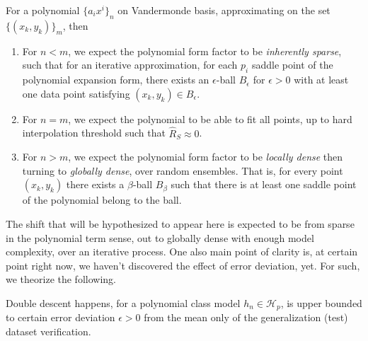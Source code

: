 \documentclass[10pt]{article} %
\begin{document}
\begin{hypothesis}\label{hyp:hypothesis_poly_dd}
For a polynomial $\{a_{i}x^{i}\}_{n}$ on Vandermonde basis, approximating on the set $\{(x_{k},y_{k})\}_{m}$, then
\begin{enumerate}[topsep=1pt,itemsep=1pt]
  \item For $n<m$, we expect the polynomial form factor to be \textit{inherently sparse}, such that for an iterative approximation, for each $p_{i}$ saddle point of the polynomial expansion form, there exists an $\epsilon$-ball $B_{\epsilon}$ for $\epsilon>0$ with at least one data point satisfying $(x_{k},y_{k})\in B_{\epsilon}$. 
  \item For $n=m$, we expect the polynomial to be able to fit all points, up to hard interpolation threshold such that $\hat{R}_{S}\approx 0$. 
  \item For $n>m$, we expect the polynomial form factor to be \textit{locally dense} then turning to \textit{globally dense}, over random ensembles. That is, for every point $(x_{k},y_{k})$ there exists a $\beta$-ball $B_{\beta}$ such that there is at least one saddle point of the polynomial belong to the ball. 
\end{enumerate}
\end{hypothesis}

The shift that will be hypothesized to appear here is expected to be from sparse in the polynomial term sense, out to globally dense with enough model complexity, over an iterative process. One also main point of clarity is, at certain point right now, we haven't discovered the effect of error deviation, yet. For such, we theorize the following. 

\begin{conjecture}
  Double descent happens, for a polynomial class model $h_{n}\in\mathcal{H}_{p}$, is upper bounded to certain error deviation $\epsilon>0$ from the mean only of the generalization (test) dataset verification. 
\end{conjecture}

\end{document}

